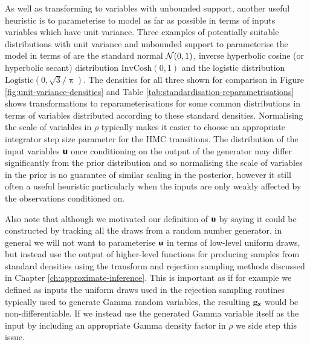 As well as transforming to variables with unbounded support, another useful heuristic is to parameterise to model as far as possible in terms of inputs variables which have unit variance. Three examples of potentially suitable distributions with unit variance and unbounded support to parameterise the model in terms of are the standard normal $\nrm{0,1}$, inverse hyperbolic cosine (or hyperbolic secant) distribution $\textrm{InvCosh}(0,1)$ and the logistic distribution $\textrm{Logistic}(0,\sqrt{3}/\uppi)$. The densities for all three shown for comparison in Figure \ref{fig:unit-variance-densities} and Table \ref{tab:standardisation-reparametrisations} shows transformations to reparameterisations for some common distributions in terms of variables distributed according to these standard densities. Normalising the scale of variables in $\rho$ typically makes it easier to choose an appropriate integrator step size parameter for the \ac{HMC} transitions. The distribution of the input variables $\boldsymbol{\mathsf{u}}$ once conditioning on the output of the generator may differ significantly from the prior distribution and so normalising the scale of variables in the prior is no guarantee of similar scaling in the posterior, however it still often a useful heuristic particularly when the inputs are only weakly affected by the observations conditioned on.

Also note that although we motivated our definition of $\boldsymbol{\mathsf{u}}$ by saying it could be constructed by tracking all the draws from a random number generator, in general we will not want to parameterise $\boldsymbol{\mathsf{u}}$ in terms of low-level uniform draws, but instead use the output of higher-level functions for producing samples from standard densities using the transform and rejection sampling methods discussed in Chapter \ref{ch:approximate-inference}. This is important as if for example we defined as inputs the uniform draws used in the rejection sampling routines typically used to generate Gamma random variables, the resulting ${\mathbf{g}}_{\boldsymbol{\mathsf{x}}}$ would be non-differentiable. If we instead use the generated Gamma variable itself as the input by including an appropriate Gamma density factor in $\rho$ we side step this issue. 


